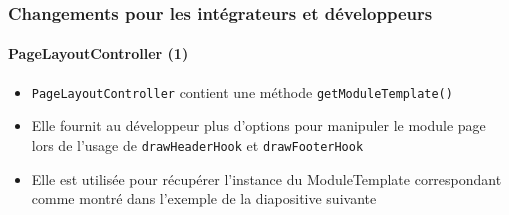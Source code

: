 %

\begin{frame}[fragile]
	\frametitle{Changements pour les intégrateurs et développeurs}
	\framesubtitle{PageLayoutController (1)}

	\begin{itemize}
		\item \texttt{PageLayoutController} contient une méthode\newline
			\texttt{getModuleTemplate()}
		\item Elle fournit au développeur plus d'options pour manipuler le module page
			lors de l'usage de \texttt{drawHeaderHook} et \texttt{drawFooterHook}
		\item Elle est utilisée pour récupérer l'instance du ModuleTemplate correspondant
			comme montré dans l'exemple de la diapositive suivante
	\end{itemize}

\end{frame}

